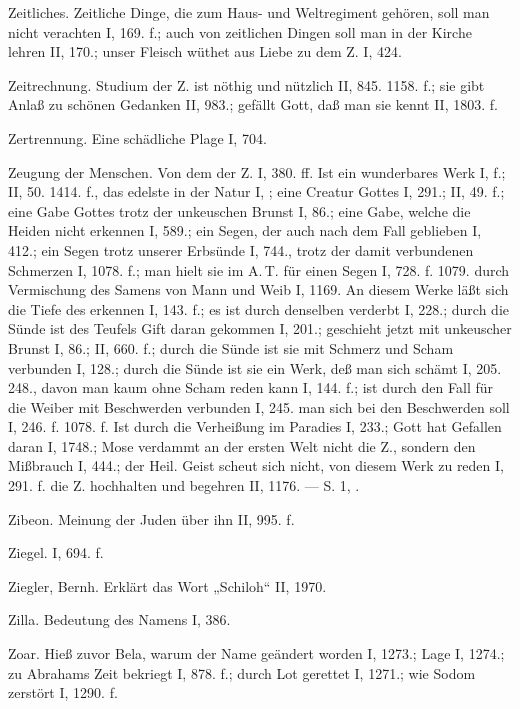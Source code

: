 Zeitliches. Zeitliche Dinge, die zum Haus- und Weltregiment gehören, soll man nicht verachten I, 169. f.; auch von zeitlichen Dingen soll man in der Kirche lehren II, 170.; unser Fleisch wüthet aus Liebe zu dem Z. I, 424.

Zeitrechnung. Studium der Z. ist nöthig und nützlich II, 845. 1158. f.; sie gibt Anlaß zu schönen Gedanken II, 983.; gefällt Gott, daß man sie kennt II, 1803. f.

Zertrennung. Eine schädliche Plage I, 704.

Zeugung der Menschen. Von dem  der Z. I, 380. ff. Ist ein wunderbares Werk I,  f.; II, 50. 1414. f., das edelste in der Natur I, ; eine Creatur Gottes I, 291.; II, 49. f.; eine Gabe Gottes trotz der unkeuschen Brunst I, 86.; eine Gabe, welche die Heiden nicht erkennen I, 589.; ein Segen, der auch nach dem Fall geblieben I, 412.; ein Segen trotz unserer Erbsünde I, 744., trotz der damit verbundenen Schmerzen I, 1078. f.; man hielt sie im A.\,T. für einen Segen I, 728. f. 1079.  durch Vermischung des Samens von Mann und Weib I, 1169. An diesem Werke läßt sich die Tiefe des  erkennen I, 143. f.; es ist durch denselben verderbt I, 228.; durch die Sünde ist des Teufels Gift daran gekommen I, 201.; geschieht jetzt mit unkeuscher Brunst I, 86.; II, 660. f.; durch die Sünde ist sie mit Schmerz und Scham verbunden I, 128.; durch die Sünde ist sie ein Werk, deß man sich schämt I, 205. 248., davon man kaum ohne Scham reden kann I, 144. f.; ist durch den Fall für die Weiber mit Beschwerden verbunden I, 245.  man sich bei den Beschwerden  soll I, 246. f. 1078. f. Ist  durch die Verheißung im Paradies I, 233.; Gott hat Gefallen daran I, 1748.; Mose verdammt an der ersten Welt nicht die Z., sondern den Mißbrauch I, 444.; der Heil. Geist scheut sich nicht, von diesem Werk zu reden I, 291. f.  die Z. hochhalten und begehren II, 1176. — S.  1, .

Zibeon. Meinung der Juden über ihn II, 995. f.

Ziegel. I, 694. f.

Ziegler, Bernh. Erklärt das Wort „Schiloh“ II, 1970.

Zilla. Bedeutung des Namens I, 386.

Zoar. Hieß zuvor Bela, warum der Name geändert worden I, 1273.; Lage I, 1274.; zu Abrahams Zeit bekriegt I, 878. f.; durch Lot gerettet I, 1271.; wie Sodom zerstört I, 1290. f.

